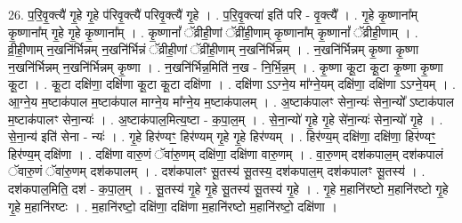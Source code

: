 \documentclass[17pt]{extarticle}
\begin{document}
26. प॒रि॒वृ॒क्त्यै॑ गृ॒हे गृ॒हे प॑रिवृ॒क्त्यै॑ परिवृ॒क्त्यै॑ गृ॒हे । . प॒रि॒वृ॒क्त्या॑ इति॑ परि - वृ॒क्त्यै᳚ । . गृ॒हे कृ॒ष्णाना᳚म् कृ॒ष्णाना᳚म् गृ॒हे गृ॒हे कृ॒ष्णाना᳚म् । . कृ॒ष्णानां᳚ ॅव्रीही॒णां ॅव्री॑ही॒णाम् कृ॒ष्णाना᳚म् कृ॒ष्णानां᳚ ॅव्रीही॒णाम् । . व्री॒ही॒णाम् न॒खनि॑र्भिन्नम् न॒खनि॑र्भिन्नं ॅव्रीही॒णां ॅव्री॑ही॒णाम् न॒खनि॑र्भिन्नम् । . न॒खनि॑र्भिन्नम् कृ॒ष्णा कृ॒ष्णा न॒खनि॑र्भिन्नम् न॒खनि॑र्भिन्नम् कृ॒ष्णा । . न॒खनि॑र्भिन्न॒मिति॑ न॒ख - नि॒र्भि॒न्न॒म् । . कृ॒ष्णा कू॒टा कू॒टा कृ॒ष्णा कृ॒ष्णा कू॒टा । . कू॒टा दक्षि॑णा॒ दक्षि॑णा कू॒टा कू॒टा दक्षि॑णा । . दक्षि॑णा ऽऽग्ने॒य मा᳚ग्ने॒यम् दक्षि॑णा॒ दक्षि॑णा ऽऽग्ने॒यम् । . आ॒ग्ने॒य म॒ष्टाक॑पाल म॒ष्टाक॑पाल माग्ने॒य मा᳚ग्ने॒य म॒ष्टाक॑पालम् । . अ॒ष्टाक॑पालꣳ सेना॒न्यः॑ सेना॒न्यो᳚ ऽष्टाक॑पाल म॒ष्टाक॑पालꣳ सेना॒न्यः॑ । . अ॒ष्टाक॑पाल॒मित्य॒ष्टा - क॒पा॒ल॒म् । . से॒ना॒न्यो॑ गृ॒हे गृ॒हे से॑ना॒न्यः॑ सेना॒न्यो॑ गृ॒हे । . से॒ना॒न्य॑ इति॑ सेना - न्यः॑ । . गृ॒हे हिर॑ण्यꣳ॒॒ हिर॑ण्यम् गृ॒हे गृ॒हे हिर॑ण्यम् । . हिर॑ण्य॒म् दक्षि॑णा॒ दक्षि॑णा॒ हिर॑ण्यꣳ॒॒ हिर॑ण्य॒म् दक्षि॑णा । . दक्षि॑णा वारु॒णं ॅवा॑रु॒णम् दक्षि॑णा॒ दक्षि॑णा वारु॒णम् । . वा॒रु॒णम् दश॑कपाल॒म् दश॑कपालं ॅवारु॒णं ॅवा॑रु॒णम् दश॑कपालम् । . दश॑कपालꣳ सू॒तस्य॑ सू॒तस्य॒ दश॑कपाल॒म् दश॑कपालꣳ सू॒तस्य॑ । . दश॑कपाल॒मिति॒ दश॑ - क॒पा॒ल॒म् । . सू॒तस्य॑ गृ॒हे गृ॒हे सू॒तस्य॑ सू॒तस्य॑ गृ॒हे । . गृ॒हे म॒हानि॑रष्टो म॒हानि॑रष्टो गृ॒हे गृ॒हे म॒हानि॑रष्टः । . म॒हानि॑रष्टो॒ दक्षि॑णा॒ दक्षि॑णा म॒हानि॑रष्टो म॒हानि॑रष्टो॒ दक्षि॑णा । \newline
\end{document}
